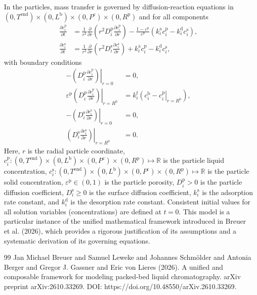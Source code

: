 \documentclass{article}
\begin{document}
In the particles, mass transfer is governed by diffusion-reaction equations in $(0, T^{\mathrm{end}}) \times (0, L^{\mathrm{b}})\times (0, P^{\mathrm{c}})\times (0, R^{\mathrm{p}})$ and for all components
\begin{align}
    \frac{\partial c^{\mathrm{p}}_{i}}{\partial t}
    &= \frac{1}{r^{2}} \frac{\partial }{\partial r} \left( r^{2} D^{\mathrm{p}}_{i} \frac{\partial c^{\mathrm{p}}_{i}}{\partial r} \right)
        - \frac{1 - \varepsilon^{\mathrm{p}}}{\varepsilon^{\mathrm{p}}}\left(k^{\mathrm{a}}_{i} c^{\mathrm{p}}_{i} - k^{\mathrm{d}}_{i} c^{\mathrm{s}}_{i} \right),
    \\
    \frac{\partial c^{\mathrm{s}}_{i}}{\partial t}
    &= \frac{1}{r^{2}} \frac{\partial }{\partial r} \left( r^{2} D^{\mathrm{s}}_{i} \frac{\partial c^{\mathrm{s}}_{i}}{\partial r} \right)
        + k^{\mathrm{a}}_{i} c^{\mathrm{p}}_{i}
        - k^{\mathrm{d}}_{i} c^{\mathrm{s}}_{i},
\end{align}
with boundary conditions
\begin{align}
    - \left. \left( D^{\mathrm{p}}_{i} \frac{\partial c^{\mathrm{p}}_{i}}{\partial r} \right) \right|_{r=0}
    &= 0,
    \\
    \varepsilon^{\mathrm{p}} \left. \left( D^{\mathrm{p}}_{i} \frac{\partial c^{\mathrm{p}}_{i}}{\partial r} \right)\right|_{r = R^{\mathrm{p}}}
    &= k^{\mathrm{f}}_{i} \left. \left( c^{\mathrm{b}}_{i} - c^{\mathrm{p}}_{i} \right|_{r = R^{\mathrm{p}}} \right),
    \\
    - \left( \left. D^{\mathrm{s}}_{i} \frac{\partial c^{\mathrm{s}}_{i}}{\partial r} \right) \right|_{r=0}
    &= 0,
    \\
    \left( \left. D^{\mathrm{s}}_{i} \frac{\partial c^{\mathrm{s}}_{i}}{\partial r} \right) \right|_{r = R^{\mathrm{p}}}
    &= 0.
\end{align}
Here, $r$ is the radial particle coordinate, $c^{\mathrm{p}}_{i}\colon (0, T^{\mathrm{end}}) \times (0, L^{\mathrm{b}})\times (0, P^{\mathrm{c}})\times (0, R^{\mathrm{p}}) \mapsto \mathbb{R}$ is the particle liquid concentration, $c^{\mathrm{s}}_{i}\colon (0, T^{\mathrm{end}}) \times (0, L^{\mathrm{b}})\times (0, P^{\mathrm{c}})\times (0, R^{\mathrm{p}}) \mapsto \mathbb{R}$ is the particle solid concentration, $\varepsilon^{\mathrm{p}}\in (0, 1)$ is the particle porosity, $D^{\mathrm{p}}_{i}> 0$ is the particle diffusion coefficient, $D^{\mathrm{s}}_{i}\geq 0$ is the surface diffusion coefficient, $k^{\mathrm{a}}_{i}$ is the adsorption rate constant, and $k^{\mathrm{d}}_{i}$ is the desorption rate constant.
Consistent initial values for all solution variables (concentrations) are defined at $t = 0$.
This model is a particular instance of the unified mathematical framework introduced in Breuer et al. (2026), which provides a rigorous justification of its assumptions and a systematic derivation of its governing equations.
\begin{thebibliography}{99}
     Jan Michael Breuer and Samuel Leweke and Johannes Schmölder and Antonia Berger and Gregor J. Gassner and Eric von Lieres (2026). A unified and composable framework for modeling packed-bed liquid chromatography. arXiv preprint arXiv:2610.33269. DOI: https://doi.org/10.48550/arXiv.2610.33269.
\end{thebibliography}
\end{document}
